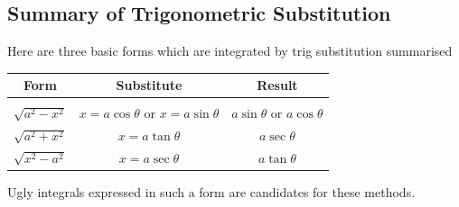 \documentclass{report}
\begin{document}
\subsection{Summary of Trigonometric Substitution} %
Here are three basic forms which are integrated by trig substitution summarised
\begin{center}
\begin{tabular}{c|c|c}
Form&Substitute&Result\\[0.5ex]
\hline
&&\\
$\sqrt{a^2-x^2}$&$x=a\cos\theta$ or $x=a\sin\theta$&$a\sin\theta$ or $a\cos\theta$\\[2ex]
$\sqrt{a^2+x^2}$&$x=a\tan\theta$&$a\sec\theta$\\[2ex]
$\sqrt{x^2-a^2}$&$x=a\sec\theta$&$a\tan\theta$
\end{tabular}
\end{center}
Ugly integrals expressed in such a form are candidates for these methods.
\end{document}
